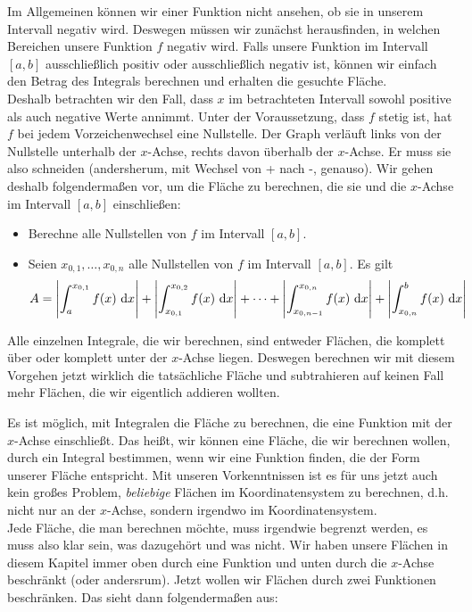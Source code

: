 \documentclass[../../main.tex]{subfiles}
\begin{document}
Im Allgemeinen können wir einer Funktion nicht ansehen, ob sie in unserem Intervall negativ wird. Deswegen müssen wir zunächst herausfinden, in welchen Bereichen unsere Funktion $f$ negativ wird. Falls unsere Funktion im Intervall $[a,b]$ ausschließlich positiv oder ausschließlich negativ ist, können wir einfach den Betrag des Integrals berechnen und erhalten die gesuchte Fläche.\\

Deshalb betrachten wir den Fall, dass $x$ im betrachteten Intervall sowohl positive als auch negative Werte annimmt. Unter der Voraussetzung, dass $f$ stetig ist, hat $f$ bei jedem Vorzeichenwechsel eine Nullstelle. Der Graph verläuft links von der Nullstelle unterhalb der $x$-Achse, rechts davon überhalb der $x$-Achse. Er muss sie also schneiden (andersherum, mit Wechsel von + nach -, genauso). Wir gehen deshalb folgendermaßen vor, um die Fläche zu berechnen, die sie und die $x$-Achse im Intervall $[a,b]$ einschließen:
\begin{itemize}
    \item Berechne alle Nullstellen von $f$ im Intervall $[a,b]$.
    \item Seien $x_{0,1},\dots,x_{0,n}$ alle Nullstellen von $f$ im Intervall $[a,b]$. Es gilt \[A=\Biggl|\int_a^{x_{0,1}} f(x)\mathop{}\mathrm{d} x\Biggr|+\Biggl|\int_{x_{0,1}}^{x_{0,2}} f(x)\mathop{}\mathrm{d} x\Biggr|+\dots+\Biggl|\int_{x_{0,n-1}}^{x_{0,n}} f(x)\mathop{}\mathrm{d} x\Biggr|+\Biggl|\int_{x_{0,n}}^b f(x)\mathop{}\mathrm{d} x\Biggr|\]
\end{itemize}
Alle einzelnen Integrale, die wir berechnen, sind entweder Flächen, die komplett über oder komplett unter der $x$-Achse liegen. Deswegen berechnen wir mit diesem Vorgehen jetzt wirklich die tatsächliche Fläche und subtrahieren auf keinen Fall mehr Flächen, die wir eigentlich addieren wollten.

Es ist möglich, mit Integralen die Fläche zu berechnen, die eine Funktion mit der $x$-Achse einschließt. Das heißt, wir können eine Fläche, die wir berechnen wollen, durch ein Integral bestimmen, wenn wir eine Funktion finden, die der Form unserer Fläche entspricht. Mit unseren Vorkenntnissen ist es für uns jetzt auch kein großes Problem, \textit{beliebige} Flächen im Koordinatensystem zu berechnen, d.h. nicht nur an der $x$-Achse, sondern irgendwo im Koordinatensystem.\\

Jede Fläche, die man berechnen möchte, muss irgendwie begrenzt werden, es muss also klar sein, was dazugehört und was nicht. Wir haben unsere Flächen in diesem Kapitel immer oben durch eine Funktion und unten durch die $x$-Achse beschränkt (oder andersrum). Jetzt wollen wir Flächen durch zwei Funktionen beschränken. Das sieht dann folgendermaßen aus:
\end{document}
